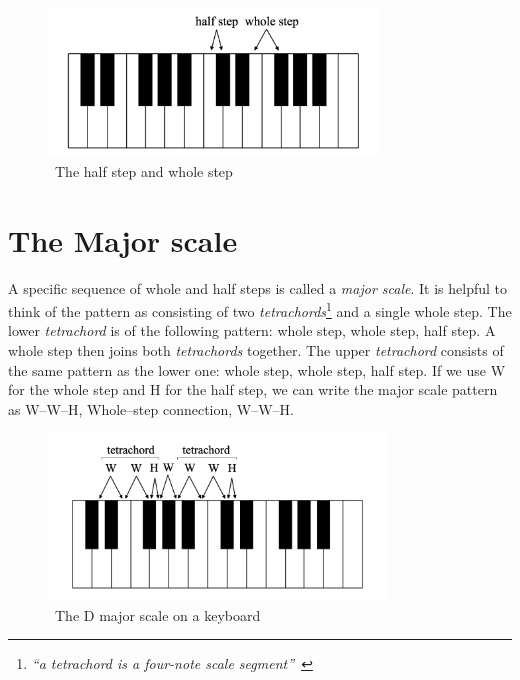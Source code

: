 \begin{figure}
    \centering
    \includegraphics[width=0.78\textwidth]{assets/half-whole-steps}
    \caption{~The half step and whole step~\cite{music-theory}}\label{fig:half-whole-steps}
\end{figure}


\section{The Major scale}\label{sec:major-scale}

A specific sequence of whole and half steps is called a \textit{major scale}.
It is helpful to think of the pattern as consisting of two \textit{tetrachords}\footnote{\textit{``a tetrachord is a four-note scale segment''~\cite{music-theory}}} and a single whole step.
The lower \textit{tetrachord} is of the following pattern: whole step, whole step, half step.
A whole step then joins both \textit{tetrachords} together.
The upper \textit{tetrachord} consists of the same pattern as the lower one: whole step, whole step, half step.
If we use W for the whole step and H for the half step, we can write the major scale pattern as W--W--H, Whole–step connection, W--W--H.~\cite{music-theory}


\begin{figure}
    \centering
    \includegraphics[width=0.8\textwidth]{assets/major-scale-keyboard}
    \caption{~The D major scale on a keyboard~\cite{music-theory}}\label{fig:major-scale-keyboard}
\end{figure}



